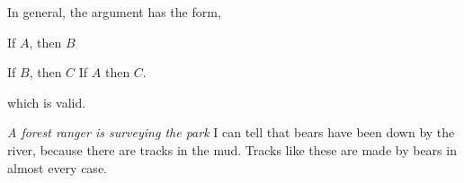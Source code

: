 \begin{exercises}
{\begin{enumerate}[label=(\roman*)]
In general, the argument has the form,

\begin{earg*}
\item If $A$, then $B$
\item If $B$, then $C$
\itemc[.2] If $A$ then $C$.
\end{earg*}
which is valid.

\end{enumerate}
}


\item \textit{A forest ranger is surveying the park} I can tell that bears have been down by the river, because there are tracks in the mud. Tracks like these are made by bears in almost every case.


\end{exercises}

